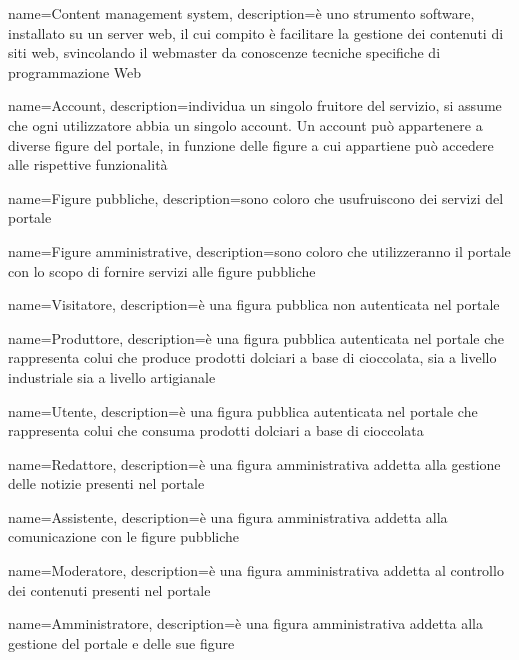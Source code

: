 
{
    name={Content management system},
    description={è uno strumento software, installato su un server web, il cui
        compito è facilitare la gestione dei contenuti di siti web, svincolando il
        webmaster da conoscenze tecniche specifiche di programmazione Web}
}


{
    name={Account},
    description={individua un singolo fruitore del servizio, si assume che ogni utilizzatore abbia un singolo account. Un account può appartenere a diverse figure del portale, in funzione delle figure a cui appartiene può accedere alle rispettive funzionalità}
}

{
    name={Figure pubbliche},
    description={sono coloro che usufruiscono dei servizi del portale}
}

{
    name={Figure amministrative},
    description={sono coloro che utilizzeranno il portale con lo scopo di fornire servizi alle figure pubbliche}
}

{
    name={Visitatore},
    description={è una figura pubblica non autenticata nel portale}
}

{
    name={Produttore},
    description={è una figura pubblica autenticata nel portale che rappresenta colui che produce prodotti dolciari a base di cioccolata, sia a livello industriale sia a livello artigianale}
}

{
    name={Utente},
    description={è una figura pubblica autenticata nel portale che rappresenta colui che consuma prodotti dolciari a base di cioccolata}
}

{
    name={Redattore},
    description={è una figura amministrativa addetta alla gestione delle notizie presenti nel portale}
}

{
    name={Assistente},
    description={è una figura amministrativa addetta alla comunicazione con le figure pubbliche}
}

{
    name={Moderatore},
    description={è una figura amministrativa addetta al controllo dei contenuti presenti nel portale}
}

{
    name={Amministratore},
    description={è una figura amministrativa addetta alla gestione del portale e delle sue figure}
}

